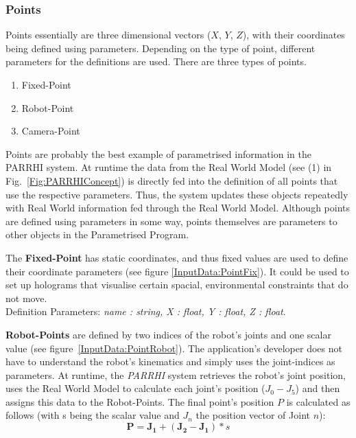 \subsubsection{Points}\label{Section:Points}
 
Points essentially are three dimensional vectors ($X$, $Y$, $Z$), with their coordinates being defined using parameters. Depending on the type of point, different parameters for the definitions are used. There are three types of points.
\begin{enumerate}
	\setlength\itemsep{-1em}
	\item Fixed-Point
	\item Robot-Point
	\item Camera-Point
\end{enumerate}

Points are probably the best example of parametrised information in the PARRHI system. At runtime the data from the Real World Model (see (1) in Fig.~\ref{Fig:PARRHIConcept}) is directly fed into the definition of all points that use the respective parameters. Thus, the system updates these objects repeatedly with Real World information fed through the Real World Model. Although points are defined using parameters in some way, points themselves are parameters to other objects in the Parametrised Program.

The \textbf{Fixed-Point} has static coordinates, and thus fixed values are used to define their coordinate parameters (see figure \ref{InputData:PointFix}). It could be used to set up holograms that visualise certain spacial, environmental constraints that do not move.\\Definition Parameters: \textit{name : string, X : float, Y : float, Z : float}.

\textbf{Robot-Points} are defined by two indices of the robot's joints and one scalar value (see figure~\ref{InputData:PointRobot}). The application's developer does not have to understand the robot's kinematics and simply uses the joint-indices as parameters. At runtime, the \textit{PARRHI} system retrieves the robot's joint position, uses the Real World Model to calculate each joint's position ($J_0 - J_5$) and then assigns this data to the Robot-Points. The final point's position $P$ is calculated as follows (with s being the scalar value and $J_n$ the position vector of Joint $n$):
\begin{equation}
\boldsymbol{P} = \boldsymbol{J_1} + (\boldsymbol{J_2}-\boldsymbol{J_1}) * s
\end{equation}

